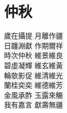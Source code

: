 \section{仲秋}
\begin{center}

歲在攝提 \fspace 月離作疆 \\
日躔淵獻 \fspace 作期爾祥 \\
時次仲秋 \fspace 維景維良 \\
碧虛凝輝 \fspace 維玄維黃 \\
輪欹影促 \fspace 維清維光 \\
蘭桂奕奕 \fspace 維德維芳 \\
金風承酢 \fspace 玉露來觴 \\
我有嘉言 \fspace 獻壽無疆
\end{center}